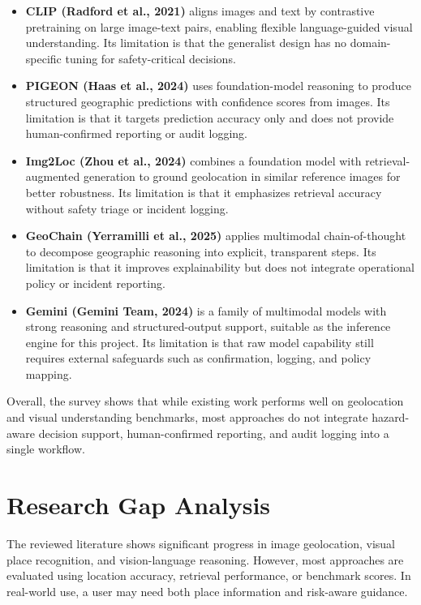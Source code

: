 \begin{itemize}
\item \textbf{CLIP (Radford et al., 2021)} \cite{radford2021clip} aligns images and text by contrastive pretraining on large image-text pairs, enabling flexible language-guided visual understanding. Its limitation is that the generalist design has no domain-specific tuning for safety-critical decisions.

\item \textbf{PIGEON (Haas et al., 2024)} \cite{haas2024pigeon} uses foundation-model reasoning to produce structured geographic predictions with confidence scores from images. Its limitation is that it targets prediction accuracy only and does not provide human-confirmed reporting or audit logging.

\item \textbf{Img2Loc (Zhou et al., 2024)} \cite{zhou2024img2loc} combines a foundation model with retrieval-augmented generation to ground geolocation in similar reference images for better robustness. Its limitation is that it emphasizes retrieval accuracy without safety triage or incident logging.

\item \textbf{GeoChain (Yerramilli et al., 2025)} \cite{yerramilli2025geochain} applies multimodal chain-of-thought to decompose geographic reasoning into explicit, transparent steps. Its limitation is that it improves explainability but does not integrate operational policy or incident reporting.

\item \textbf{Gemini (Gemini Team, 2024)} \cite{team2024gemini} is a family of multimodal models with strong reasoning and structured-output support, suitable as the inference engine for this project. Its limitation is that raw model capability still requires external safeguards such as confirmation, logging, and policy mapping.
\end{itemize}

Overall, the survey shows that while existing work performs well on geolocation and visual understanding benchmarks, most approaches do not integrate hazard-aware decision support, human-confirmed reporting, and audit logging into a single workflow.

\section{Research Gap Analysis}
The reviewed literature shows significant progress in image geolocation, visual place recognition, and vision-language reasoning. However, most approaches are evaluated using location accuracy, retrieval performance, or benchmark scores. In real-world use, a user may need both place information and risk-aware guidance.

